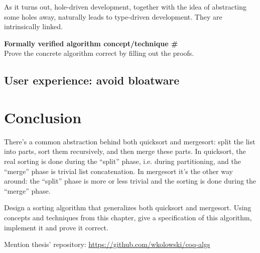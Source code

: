 \documentclass[declaration,mgr,english,shortabstract]{iithesis}
\newcommand{\repo}{\url{https://github.com/wkolowski/coq-algs}}
\newcounter{cnt}
\newcommand{\runcnt}{\#\arabic{cnt}}
\newcommand{\concept}[1]
{
    \refstepcounter{cnt}
    \begin{center}
        \textbf{Formally verified algorithm concept/technique \runcnt} \\
        #1
    \end{center}
}
\begin{document}
As it turns out, hole-driven development, together with the idea of abstracting some holes away, naturally leads to type-driven development. They are intrinsically linked.

\concept{Prove the concrete algorithm correct by filling out the proofs.}

\section{User experience: avoid bloatware} \label{bloatware}

\chapter{Conclusion} \label{conclusion}

There's a common abstraction behind both quicksort and mergesort: split the list into parts, sort them recursively, and then merge these parts. In quicksort, the real sorting is done during the ``split'' phase, i.e. during partitioning, and the ``merge'' phase is trivial list concatenation. In mergesort it's the other way around: the ``split'' phase is more or less trivial and the sorting is done during the ``merge'' phase.

Design a sorting algorithm that generalizes both quicksort and mergesort. Using concepts and techniques from this chapter, give a specification of this algorithm, implement it and prove it correct.

Mention thesis' repository: \repo


\newcommand{\wayback}[1]{\href{#1}{WaybackMachine copy}}
\end{document}
